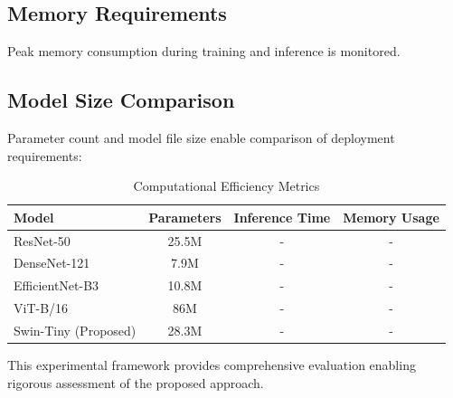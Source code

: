 \subsection{Memory Requirements}

Peak memory consumption during training and inference is monitored.

\subsection{Model Size Comparison}

Parameter count and model file size enable comparison of deployment requirements:

\begin{table}[H]
\centering
\caption{Computational Efficiency Metrics}
\label{tab:comp_efficiency}
\begin{tabular}{|l|c|c|c|}
\hline
\textbf{Model} & \textbf{Parameters} & \textbf{Inference Time} & \textbf{Memory Usage} \\
\hline
ResNet-50 & 25.5M & - & - \\
DenseNet-121 & 7.9M & - & - \\
EfficientNet-B3 & 10.8M & - & - \\
ViT-B/16 & 86M & - & - \\
Swin-Tiny (Proposed) & 28.3M & - & - \\
\hline
\end{tabular}
\end{table}

This experimental framework provides comprehensive evaluation enabling rigorous assessment of the proposed approach.
